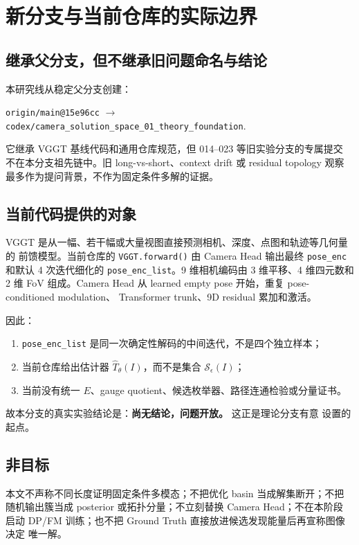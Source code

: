 \documentclass[UTF8,a4paper,11pt]{ctexart}
\newcommand{\Sset}{\mathcal S}
\begin{document}
\section{新分支与当前仓库的实际边界}

\subsection{继承父分支，但不继承旧问题命名与结论}

本研究线从稳定父分支创建：
\begin{center}
\texttt{origin/main@15e96cc}
$\longrightarrow$
\texttt{codex/camera\_solution\_space\_01\_theory\_foundation}.
\end{center}
它继承 VGGT 基线代码和通用仓库规范，但 014--023 等旧实验分支的专属提交
不在本分支祖先链中。旧 long-vs-short、context drift 或 residual topology 观察
最多作为提问背景，不作为固定条件多解的证据。

\subsection{当前代码提供的对象}

VGGT 是从一幅、若干幅或大量视图直接预测相机、深度、点图和轨迹等几何量的
前馈模型\citep{wang2025vggt}。当前仓库的 \texttt{VGGT.forward()} 由 Camera
Head 输出最终 \texttt{pose\_enc} 和默认 4 次迭代细化的
\texttt{pose\_enc\_list}。9 维相机编码由 3 维平移、4 维四元数和 2 维 FoV
组成。Camera Head 从 learned empty pose 开始，重复 pose-conditioned modulation、
Transformer trunk、9D residual 累加和激活。

因此：
\begin{enumerate}
  \item \texttt{pose\_enc\_list} 是同一次确定性解码的中间迭代，不是四个独立样本；
  \item 当前仓库给出估计器 $\widehat T_\theta(I)$，而不是集合 $\Sset_\epsilon(I)$；
  \item 当前没有统一 $E$、gauge quotient、候选枚举器、路径连通检验或分量证书。
\end{enumerate}

故本分支的真实实验结论是：\textbf{尚无结论，问题开放。} 这正是理论分支有意
设置的起点。

\subsection{非目标}

本文不声称不同长度证明固定条件多模态；不把优化 basin 当成解集断开；不把
随机输出簇当成 posterior 或拓扑分量；不立刻替换 Camera Head；不在本阶段
启动 DP/FM 训练；也不把 Ground Truth 直接放进候选发现能量后再宣称图像决定
唯一解。
\end{document}
